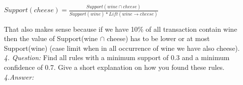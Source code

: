 \documentclass[a4paper]{article}
\begin{document}
\begin{center}
	$Support(cheese) = \frac{Support(wine\cap cheese)}{Support(wine) * Lift(wine \rightarrow cheese)}$
\end{center}
That also makes sense because if we have 10\% of all transaction contain wine then the value of Support(wine $\cap$ cheese) has to be lower or at most Support(wine) (case limit when in all occurrence of wine we have also cheese).\\
\newline
\textit{4. Question:} Find all rules with a minimum support of 0.3 and a minimum confidence of 0.7. Give a
short explanation on how you found these rules.\\
\textit{4.Answer:} 

\begin{thebibliography}{9}
\end{thebibliography}
\end{document}
